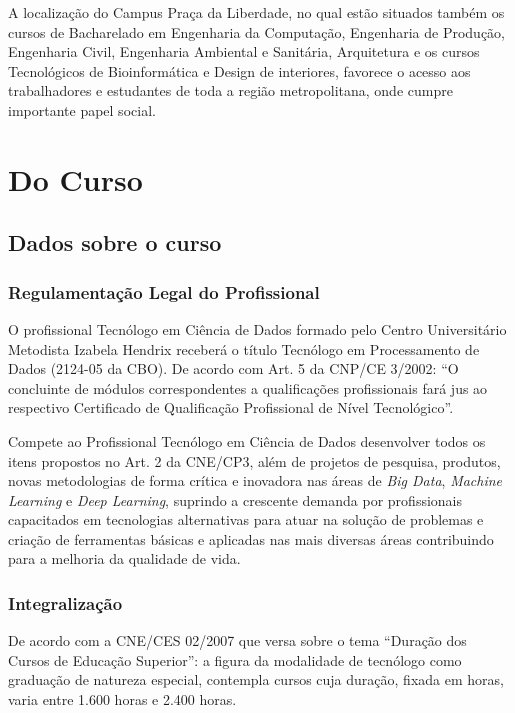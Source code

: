 \documentclass[a4paper, 12pt, openright, oneside, german, french, english, brazil]{abntex2}
\begin{document}
A localização do Campus Praça da Liberdade, no qual estão situados também os cursos de Bacharelado em Engenharia da Computação, Engenharia de Produção, Engenharia Civil, Engenharia Ambiental e Sanitária, Arquitetura e os cursos Tecnológicos de Bioinformática e Design de interiores, favorece o acesso aos trabalhadores e estudantes de toda a região metropolitana, onde cumpre importante papel social.


\part{Do Curso}

\chapter{Dados sobre o curso}

\section{Regulamentação Legal do Profissional}

O profissional Tecnólogo em Ciência de Dados formado pelo Centro Universitário Metodista Izabela Hendrix receberá o título Tecnólogo em Processamento de Dados (2124-05 da CBO). De acordo com Art. 5 da CNP/CE 3/2002: ``O concluinte de módulos correspondentes a qualificações profissionais fará jus ao respectivo Certificado de Qualificação Profissional de Nível Tecnológico''.

Compete ao Profissional Tecnólogo em Ciência de Dados desenvolver todos os itens propostos no Art. 2 da CNE/CP3, além de projetos de pesquisa, produtos, novas metodologias de forma crítica e inovadora nas áreas de \textit{Big Data}, \textit{Machine Learning} e \textit{Deep Learning}, suprindo a crescente demanda por profissionais capacitados em tecnologias alternativas para atuar na solução de problemas e criação de ferramentas básicas e aplicadas nas mais diversas áreas contribuindo para a melhoria da qualidade de vida.

\section{Integralização}

De acordo com a CNE/CES 02/2007 que versa sobre o tema ``Duração dos Cursos de Educação Superior'': a figura da modalidade de tecnólogo como graduação de natureza especial, contempla cursos cuja duração, fixada em horas, varia entre 1.600 horas e 2.400 horas.
\end{document}
